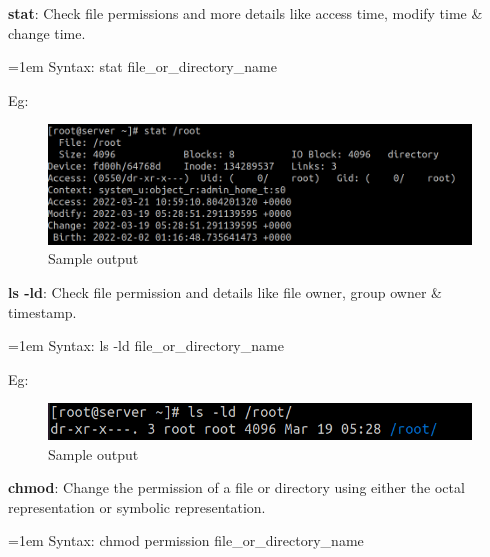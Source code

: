 \setlength{\columnsep}{3pt}
\begin{flushleft}
	\bigskip
	\textbf{stat}: Check file permissions and more details like access time, modify time \& change time.
	\bigskip
	\begin{tcolorbox}[breakable,notitle,boxrule=0pt,colback=pink,colframe=pink]
		\color{black}
		\font=1em
		Syntax: stat  file\_or\_directory\_name
		\font=4pt
	\end{tcolorbox}
	
	Eg:
	\begin{figure}[h!]
		\centering
		\includegraphics[scale=0.4]{content/chapter5/images/stat.png}
		\caption{Sample output}
		\label{fig:sample2}
	\end{figure}
	
	\textbf{ls -ld}: Check file permission and details like file owner, group owner \& timestamp.
	\bigskip
	\begin{tcolorbox}[breakable,notitle,boxrule=0pt,colback=pink,colframe=pink]
		\color{black}
		\font=1em
		Syntax: ls -ld  file\_or\_directory\_name
		\font=4pt
	\end{tcolorbox}
	
	Eg:
	\begin{figure}[h!]
		\centering
		\includegraphics[scale=0.6]{content/chapter5/images/ls.png}
		\caption{Sample output}
		\label{fig:sample3}
	\end{figure}
	
	
	\newpage
	
	
	\textbf{chmod}: Change the permission of a file or directory using either the octal representation 
	or symbolic representation.
	\bigskip
	\begin{tcolorbox}[breakable,notitle,boxrule=0pt,colback=pink,colframe=pink]
		\color{black}
		\font=1em
		Syntax: chmod  permission  file\_or\_directory\_name
		\font=4pt
	\end{tcolorbox}
	

\end{flushleft}
